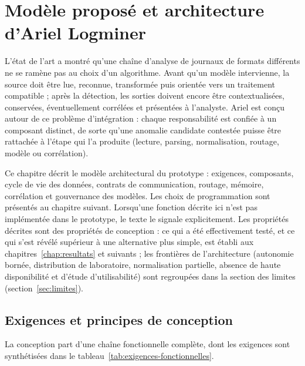 \chapter{Modèle proposé et architecture d'Ariel Logminer}

\label{chap:architecture}

L'état de l'art a montré qu'une chaîne d'analyse de journaux de formats différents ne se ramène pas au choix d'un algorithme. Avant qu'un modèle intervienne, la source doit être lue, reconnue, transformée puis orientée vers un traitement compatible ; après la détection, les sorties doivent encore être contextualisées, conservées, éventuellement corrélées et présentées à l'analyste. Ariel \logminer{} est conçu autour de ce problème d'intégration : chaque responsabilité est confiée à un composant distinct, de sorte qu'une anomalie candidate contestée puisse être rattachée à l'étape qui l'a produite (lecture, parsing, normalisation, routage, modèle ou corrélation).

Ce chapitre décrit le modèle architectural du prototype : exigences, composants, cycle de vie des données, contrats de communication, routage, mémoire, corrélation et gouvernance des modèles. Les choix de programmation sont présentés au chapitre suivant. Lorsqu'une fonction décrite ici n'est pas implémentée dans le prototype, le texte le signale explicitement. Les propriétés décrites sont des propriétés de conception : ce qui a été effectivement testé, et ce qui s'est révélé supérieur à une alternative plus simple, est établi aux chapitres~\ref{chap:resultats} et suivants ; les frontières de l'architecture (autonomie bornée, distribution de laboratoire, normalisation partielle, absence de haute disponibilité et d'étude d'utilisabilité) sont regroupées dans la section des limites (section~\ref{sec:limites}).

\section{Exigences et principes de conception}

\label{sec:exigences-principes}

La conception part d'une chaîne fonctionnelle complète, dont les exigences sont synthétisées dans le tableau~\ref{tab:exigences-fonctionnelles}.

